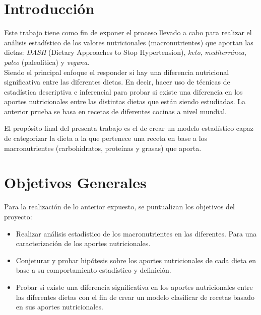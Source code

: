 \documentclass[12pt,a4paper]{article}
\begin{document}
\newpage

\tableofcontents

\newpage

\section{Introducción}

    Este trabajo tiene como fin de exponer el proceso llevado a cabo para 
    realizar el análisis estadístico de los valores nutricionales (macronutrientes) 
    que aportan las dietas: \emph{DASH} (Dietary Approaches to Stop Hypertension), 
    \emph{keto}, \emph{mediterránea}, \emph{paleo} (paleolítica) y \emph{vegana}.\\

    Siendo el principal enfoque el responder si hay una diferencia nutricional 
    significativa entre las diferentes dietas. En decir, hacer uso de 
    técnicas de estadística descriptiva e inferencial para probar si existe 
    una diferencia en los aportes nutricionales entre las distintas dietas que 
    están siendo estudiadas. La anterior prueba se basa en recetas de diferentes 
    cocinas a nivel mundial.

    El propósito final del presenta trabajo es el de crear un modelo estadístico 
    capaz de categorizar la dieta a la que pertenece una receta en base a los 
    macronutrientes (carbohidratos, proteínas y grasas) que aporta.

\section{Objetivos Generales}

    Para la realización de lo anterior expuesto, se puntualizan los objetivos del 
    proyecto:
    \begin{itemize}
        \item Realizar análisis estadístico de los macronutrientes en las diferentes. 
        Para una caracterización de los aportes nutricionales.
        \item Conjeturar y probar hipótesis sobre los aportes nutricionales de 
        cada dieta en base a su comportamiento estadístico y definición.
        \item Probar si existe una diferencia significativa en los aportes 
        nutricionales entre las diferentes dietas con el fin de crear un 
        modelo clasificar de recetas basado en sus aportes nutricionales.
    \end{itemize}
\end{document}

